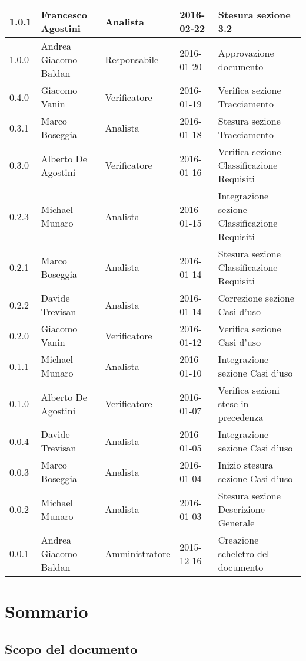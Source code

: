 \documentclass{scalatekids-article}
\begin{document}
\begin{center}
\begin{longtable}{| l | l | l | l | p{5cm} |}
    \hline
    1.0.1 & Francesco Agostini & Analista & 2016-02-22 & Stesura sezione 3.2\\
    \hline
    1.0.0 & Andrea Giacomo Baldan & Responsabile & 2016-01-20 & Approvazione documento\\
    \hline
    0.4.0 & Giacomo Vanin & Verificatore & 2016-01-19 & Verifica sezione Tracciamento\\
    \hline
    0.3.1 & Marco Boseggia & Analista & 2016-01-18 & Stesura sezione Tracciamento\\
    \hline
    0.3.0 & Alberto De Agostini & Verificatore & 2016-01-16 & Verifica sezione Classificazione Requisiti\\
    \hline
    0.2.3 & Michael Munaro & Analista & 2016-01-15 & Integrazione sezione Classificazione Requisiti\\
    \hline
    0.2.1 & Marco Boseggia & Analista & 2016-01-14 & Stesura sezione Classificazione Requisiti\\
    \hline
    0.2.2 & Davide Trevisan & Analista & 2016-01-14 & Correzione sezione Casi d'uso\\
    \hline
    0.2.0 & Giacomo Vanin & Verificatore & 2016-01-12 & Verifica sezione Casi d'uso\\
    \hline
    0.1.1 & Michael Munaro & Analista & 2016-01-10 & Integrazione sezione Casi d'uso\\
    \hline
    0.1.0 & Alberto De Agostini & Verificatore & 2016-01-07 & Verifica sezioni stese in precedenza\\
    \hline
    0.0.4 & Davide Trevisan & Analista & 2016-01-05 & Integrazione sezione Casi d'uso\\
    \hline
    0.0.3 & Marco Boseggia & Analista & 2016-01-04 & Inizio stesura sezione Casi d'uso\\
    \hline
    0.0.2 & Michael Munaro & Analista & 2016-01-03 & Stesura sezione Descrizione Generale\\
    \hline
    0.0.1 & Andrea Giacomo Baldan & Amministratore & 2015-12-16 & Creazione scheletro del documento\\
    \hline
  \end{longtable}
\end{center}
\tableofcontents
\newpage
{}

\section{Sommario}

\subsection{Scopo del documento}
\end{document}
